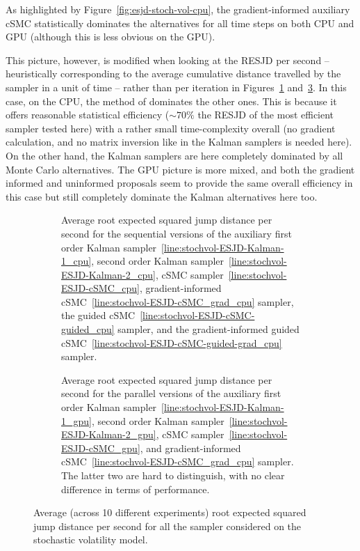 As highlighted by Figure~\ref{fig:esjd-stoch-vol-cpu}, the gradient-informed auxiliary cSMC statistically dominates the alternatives for all time steps on both CPU and GPU (although this is less obvious on the GPU).

This picture, however, is modified when looking at the RESJD per second -- heuristically corresponding to the average cumulative distance travelled by the sampler in a unit of time --
rather than per iteration in Figures~\ref{fig:esjd-time-stoch-vol-cpu} and~\ref{fig:esjd-time-stoch-vol-gpu}. In this case, on the CPU, the method of \citet{finke2021csmc} dominates the other ones. This is because it offers reasonable statistical efficiency ($\sim70\%$ the RESJD of the most efficient sampler tested here) with a rather small time-complexity overall (no gradient calculation, and no matrix inversion like in the Kalman samplers is needed here). On the other hand, the Kalman samplers are here completely dominated by all Monte Carlo alternatives. The GPU picture is more mixed, and both the gradient informed and uninformed proposals seem to provide the same overall efficiency in this case but still completely dominate the Kalman alternatives here too.
\begin{figure}[htb!]
    \centering
    \begin{subfigure}[t]{.45\textwidth}
        \centering
        \resizebox{\columnwidth}{!}{}
        \caption{Average root expected squared jump distance per second for the sequential versions of the auxiliary first order Kalman sampler~\ref{line:stochvol-ESJD-Kalman-1_cpu}, second order Kalman sampler~\ref{line:stochvol-ESJD-Kalman-2_cpu}, cSMC sampler~\ref{line:stochvol-ESJD-cSMC_cpu}, gradient-informed cSMC~\ref{line:stochvol-ESJD-cSMC_grad_cpu} sampler, the guided cSMC~\ref{line:stochvol-ESJD-cSMC-guided_cpu} sampler, and the gradient-informed guided cSMC~\ref{line:stochvol-ESJD-cSMC-guided-grad_cpu} sampler.}
        \label{fig:esjd-time-stoch-vol-cpu}
    \end{subfigure}%
    \hfill
    \begin{subfigure}[t]{.45\textwidth}
        \centering
        \resizebox{\columnwidth}{!}{}
        \caption{Average root expected squared jump distance per second for the parallel versions of the auxiliary first order Kalman sampler~\ref{line:stochvol-ESJD-Kalman-1_gpu}, second order Kalman sampler~\ref{line:stochvol-ESJD-Kalman-2_gpu}, cSMC sampler~\ref{line:stochvol-ESJD-cSMC_gpu}, and gradient-informed cSMC~\ref{line:stochvol-ESJD-cSMC_grad_cpu} sampler. The latter two are hard to distinguish, with no clear difference in terms of performance.}
        \label{fig:esjd-time-stoch-vol-gpu}
    \end{subfigure}
    \caption{Average (across 10 different experiments) root expected squared jump distance per second for all the sampler considered on the stochastic volatility model.}
\end{figure}

